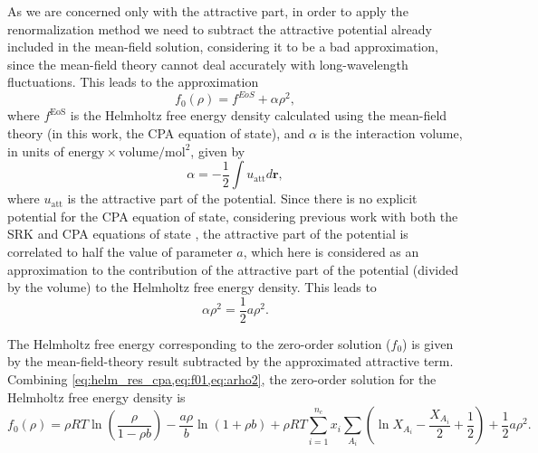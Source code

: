 \documentclass[preprint,12pt,3p]{elsarticle}
\begin{document}
As we are concerned only with the attractive part, in order to apply the renormalization method we need to subtract the attractive potential already included in the mean-field solution, considering it to be a bad approximation, since the mean-field theory cannot deal accurately with long-wavelength fluctuations.
This leads to the approximation
\begin{equation} \label{eq:f01}
f_{0}(\rho) = f^{EoS} + \alpha\rho^2,
\end{equation}
where $f^\text{EoS}$ is the Helmholtz free energy density calculated using the mean-field theory (in this work, the CPA equation of state), and $\alpha$ is the interaction volume, in units of $\mathrm{energy \times volume/mol^2}$, given by
\begin{equation} \label{eq:alphav}
\alpha = -\frac{1}{2} \int u_\text{att} d\textbf{r},
\end{equation}
where $u_\text{att}$ is the attractive part of the potential.
Since there is no explicit potential for the CPA equation of state, considering previous work with both the SRK and CPA equations of state \cite{cai2004thermodynamics, pcm2017application, xu2010crossover}, the attractive part of the potential is correlated to half the value of parameter $a$, which here is considered as an approximation to the contribution of the attractive part of the potential (divided by the volume) to the Helmholtz free energy density.
This leads to
\begin{equation} \label{eq:arho2}
\alpha\rho^2 = \frac{1}{2}a\rho^2.
\end{equation}

The Helmholtz free energy corresponding to the zero-order solution ($f_{0}$) is given by the mean-field-theory result subtracted by the approximated attractive term.
Combining \cref{eq:helm_res_cpa,eq:f01,eq:arho2}, the zero-order solution for the Helmholtz free energy density is
\begin{equation} \label{eq:f00}
f_{0}(\rho) = \rho RT\ln\left(\frac{\rho}{1-\rho b}\right)-\frac{a\rho}{b}\ln(1+\rho b) + \rho RT\sum_{i=1}^{n_c} x_{i} \sum_{A_{i}}\left(\ln X_{A_{i}} - \frac{X_{A_{i}}}{2} + \frac{1}{2}\right) + \frac{1}{2} a\rho^2.
\end{equation}  
\end{document}
